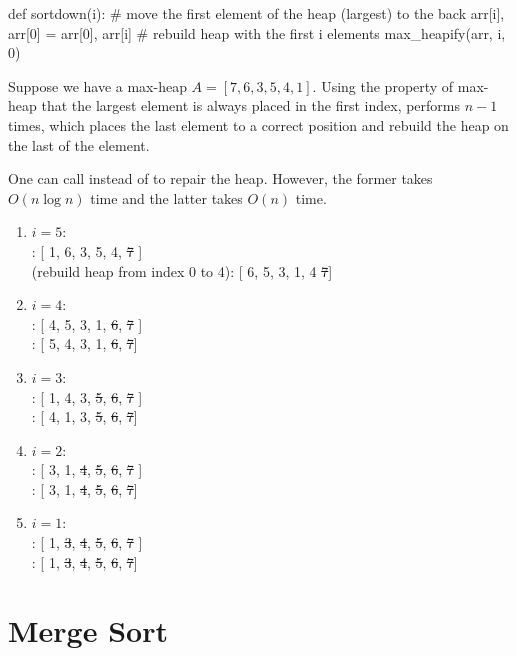 \begin{python}
    def sortdown(i):
        # move the first element of the heap (largest) to the back
        arr[i], arr[0] = arr[0], arr[i]
        # rebuild heap with the first i elements
        max_heapify(arr, i, 0)
\end{python}

Suppose we have a max-heap $A = [ 7, 6, 3, 5, 4, 1]$. Using the property of max-heap that the largest element is always placed in the first index,  performs  $n - 1$ times, which places the last element to a correct position and rebuild the heap on the last of the element.

One can call  instead of  to repair the heap. However, the former takes $O(n \log n)$ time and the latter takes $O(n)$ time.

\begin{enumerate}
  \item $i = 5$: \\
    : [ 1, 6, 3, 5, 4, \st{7} ] \\
     (rebuild heap from index 0 to 4): [ 6, 5, 3, 1, 4 \st{7}]
  \item $i = 4$: \\
    : [ 4, 5, 3, 1, \st{6}, \st{7} ] \\
    : [ 5, 4, 3, 1, \st{6}, \st{7}]
  \item $i = 3$: \\
    : [ 1, 4, 3, \st{5}, \st{6}, \st{7} ] \\
    : [ 4, 1, 3, \st{5}, \st{6}, \st{7}]
  \item $i = 2$: \\
    : [ 3, 1, \st{4}, \st{5}, \st{6}, \st{7} ] \\
    : [ 3, 1, \st{4}, \st{5}, \st{6}, \st{7}]
  \item $i = 1$: \\
    : [ 1, \st{3}, \st{4}, \st{5}, \st{6}, \st{7} ] \\
    : [ 1, \st{3}, \st{4}, \st{5}, \st{6}, \st{7}]
\end{enumerate}

\section{Merge Sort}

